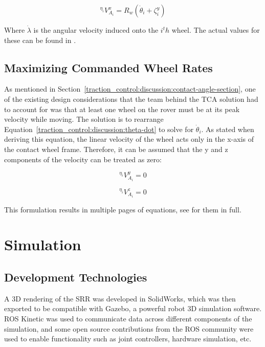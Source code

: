 \begin{equation}\label{traction_control:discussion:theta-dot}
	{}^{\eta_{i}}V^{x}_{A_{i}} = R_{w}\left(\dot{\theta}_{i} + \zeta^{y}_{i}\right)
\end{equation}

Where $\dot{\lambda}$ is the angular velocity induced onto the $i^th$ wheel. The actual values for these can be found in \cite{tractl}.

\subsection{Maximizing Commanded Wheel Rates}\label{traction_control:discussion:max-wheel-rates}
As mentioned in Section~\ref{traction_control:discussion:contact-angle-section}, one of the existing design considerations that the team behind the \ac{TCA} solution had to account for was that at least one wheel on the rover must be at its peak velocity while moving. The solution is to rearrange Equation~\ref{traction_control:discussion:theta-dot} to solve for $\dot{\theta}_{i}$. As stated when deriving this equation, the linear velocity of the wheel acts only in the x-axis of the contact wheel frame. Therefore, it can be assumed that the y and z components of the velocity can be treated as zero:

\begin{equation}\label{traction_control:discussion:lin_vel_y}
	{}^{\eta_{i}}V^{y}_{A_{i}} = 0
\end{equation}

\begin{equation}\label{traction_control:discussion:lin_vel_z}
	{}^{\eta_{i}}V^{z}_{A_{i}} = 0
\end{equation}

This formulation results in multiple pages of equations, see \cite{tractl} for them in full.

\acresetall
\section{Simulation}
\subsection{Development Technologies}\label{traction_control:discussion:dev-tech-section}
A 3D rendering of the \ac{SRR} was developed in SolidWorks, which was then exported to be compatible with Gazebo, a powerful robot 3D simulation software. ROS Kinetic was used to communicate data across different components of the simulation, and some open source contributions from the ROS community were used to enable functionality such as joint controllers, hardware simulation, etc. \\

